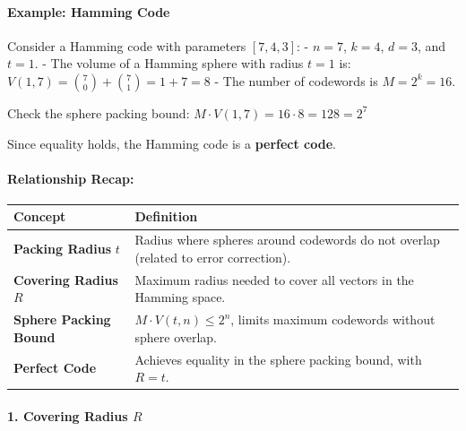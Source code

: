 \documentclass[11pt]{article}
\begin{document}
\paragraph{\texorpdfstring{\textbf{Example: Hamming
Code}}{Example: Hamming Code}}\label{example-hamming-code}

Consider a Hamming code with parameters \([7, 4, 3]\): - \(n = 7\),
\(k = 4\), \(d = 3\), and \(t = 1\). - The volume of a Hamming sphere
with radius \(t = 1\) is:
\(V(1, 7) = \binom{7}{0} + \binom{7}{1} = 1 + 7 = 8\) - The number of
codewords is \(M = 2^k = 16\).

Check the sphere packing bound:
\(M \cdot V(1, 7) = 16 \cdot 8 = 128 = 2^7\)

Since equality holds, the Hamming code is a \textbf{perfect code}.

\paragraph{\texorpdfstring{\textbf{Relationship
Recap:}}{Relationship Recap:}}\label{relationship-recap}

\begin{longtable}[]{@{}
  >{\raggedright\arraybackslash}p{}
  >{\raggedright\arraybackslash}p{}@{}}
\toprule\noalign{}
\begin{minipage}[b]{\linewidth}\raggedright
\textbf{Concept}
\end{minipage} & \begin{minipage}[b]{\linewidth}\raggedright
\textbf{Definition}
\end{minipage} \\
\midrule\noalign{}
\endhead
\bottomrule\noalign{}
\endlastfoot
\textbf{Packing Radius} \(t\) & Radius where spheres around codewords do
not overlap (related to error correction). \\
\textbf{Covering Radius} \(R\) & Maximum radius needed to cover all
vectors in the Hamming space. \\
\textbf{Sphere Packing Bound} & \(M \cdot V(t, n) \leq 2^n\), limits
maximum codewords without sphere overlap. \\
\textbf{Perfect Code} & Achieves equality in the sphere packing bound,
with \(R = t\). \\
\end{longtable}

\paragraph{\texorpdfstring{\textbf{1. Covering Radius
\(R\)}}{1. Covering Radius R}}\label{covering-radius-r}
\end{document}
